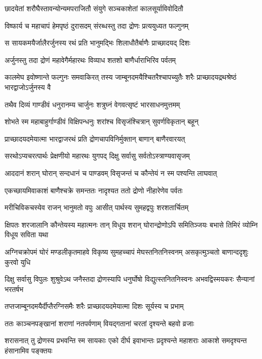 \twolineshloka
{छादयेतां शरौघैस्तावन्योन्यमपराजितौ}
{संयुगे सञ्चकाशेतां कालसूर्याविवोदितौ}


\twolineshloka
{विष्फार्य च महाचापं हेमपृष्ठं दुरासदम्}
{संरब्धस्तु तदा द्रोणः प्रत्ययुध्यत फल्गुनम्}


\twolineshloka
{स सायकमयैर्जालैरर्जुनस्य रथं प्रति}
{भानुमद्भिः शिलाधौतैर्बाणैः प्राच्छादयद् दिशः}


\twolineshloka
{अर्जुनस्तु तदा द्रोणं महावेगैर्महारथः}
{विव्याध शतशो बाणैर्धाराभिरिव पर्वतम्}


\onelineshloka
{कालमेघ इवोष्णान्ते फल्गुनः समवाकिरत्}
\twolineshloka
{तस्य जाम्बूनदमयैश्चितरैश्चापच्युतैः शरैः}
{प्राच्छादयद्रथश्रेष्ठं भारद्वाजोऽर्जुनस्य वै}


\twolineshloka
{तथैव दिव्यं गाण्डीवं धनुरानम्य चार्जुनः}
{शत्रुघ्नं वेगवत्सृष्टं भारसाधनमुत्तमम्}


\twolineshloka
{शोभते स्म महाबाहुर्गाण्डीवं विक्षिपन्धनुः}
{शरांश्च विसृजंश्चित्रान् सुवर्णविकृतान् बहून्}


\twolineshloka
{प्राच्छादयदमेयात्मा भारद्वाजरथं प्रति}
{द्रोणचापविनिर्मुक्तान् बाणान् बाणैरवारयत्}


\twolineshloka
{सरथोऽप्यचरत्पार्थः प्रेक्षणीयो महारथः}
{युगपद् दिक्षु सर्वासु सर्वतोऽस्त्राण्यवासृजम्}


\twolineshloka
{आददानं शरान् घोरान् सन्दधानं च पाण्डवम्}
{विसृजन्तं च कौन्तेयं न स्म पश्यन्ति लाघवात्}


\twolineshloka
{एकच्छायमिवाकाशं बाणैश्चक्रे समन्ततः}
{नादृश्यत ततो द्रोणो नीहारेणेव पर्वतः}


\twolineshloka
{मरीचिविकचस्येव राजन् भानुमतो वपुः}
{आसीत् पार्थस्य सुमहद्वपुः शरशतार्चितम्}


\threelineshloka
{क्षिपतः शरजालानि कौन्तेयस्य महात्मनः}
{तान् विधूय शरान् घोरान्द्रोणोऽपि समितिञ्जयः}
{बभासे तिमिरं व्योम्नि विधूय सविता यथा}


\threelineshloka
{अग्निचक्रोपमं घोरं मण्डलीकृतमाहवे}
{विकृष्य सुमहच्चापं मेघस्तनितनिस्वनम्}
{असकृत्मुञ्चतो बाणान्ददृशुः कुरवो युधि}


\threelineshloka
{दिक्षु सर्वासु विपुलः शुश्रुवेऽथ जनैस्तदा}
{द्रोणस्यापि धनुर्घोषो विद्युत्स्तनितनिस्वनः}
{अभवद्विस्मयकरः सैन्यानां भरतर्षभ}


\twolineshloka
{तप्तजाम्बूनदमयैर्दीप्तैरग्निसमैः शरैः}
{प्राच्छादयदमेयात्मा दिशः सूर्यस्य च प्रभाम्}


\twolineshloka
{ततः काञ्चनपङ्खानां शराणां नतपर्वणाम्}
{वियद्गतानां चरतां दृश्यन्ते बहवो व्रजाः}


\threelineshloka
{शरासनात् तु द्रोणस्य प्रभवन्ति स्म सायकाः}
{एको दीर्घ इवाभान्तः प्रदृश्यन्ते महाशराः}
{आकाशे समदृश्यन्त हंसानामिव पङ्क्तयः}


